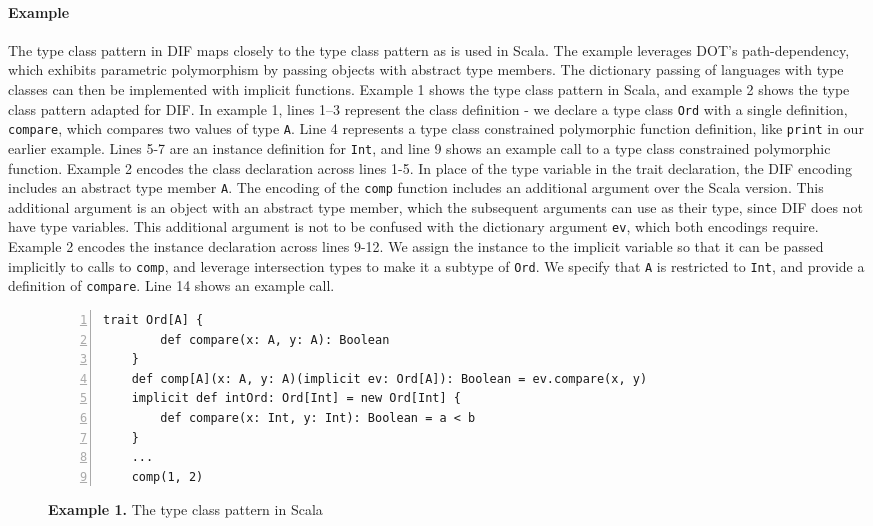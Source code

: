 \paragraph{Example} The type class pattern \cite{OBLB18} in DIF maps closely to
the type class pattern as is used in Scala. The example leverages DOT's
path-dependency, which exhibits parametric polymorphism by passing objects with
abstract type members. The dictionary passing of languages with type classes can
then be implemented with implicit functions. Example 1 shows the type class
pattern in Scala, and example 2 shows the type class pattern adapted for DIF. In
example 1, lines 1--3 represent the class definition - we declare a type class
\texttt{Ord} with a single definition, \texttt{compare}, which compares two
values of type \texttt{A}. Line 4 represents a type class constrained
polymorphic function definition, like \texttt{print} in our earlier example.
Lines 5-7 are an instance definition for \texttt{Int}, and line 9 shows an
example call to a type class constrained polymorphic function. Example 2 encodes
the class declaration across lines 1-5. In place of the type variable in the
trait declaration, the DIF encoding includes an abstract type member \texttt{A}.
The encoding of the \texttt{comp} function includes an additional argument over
the Scala version. This additional argument is an object with an abstract type
member, which the subsequent arguments can use as their type, since DIF does not
have type variables. This additional argument is not to be confused with the
dictionary argument \texttt{ev}, which both encodings require. Example 2 encodes
the instance declaration across lines 9-12. We assign the instance to the
implicit variable so that it can be passed implicitly to calls to \texttt{comp},
and leverage intersection types to make it a subtype of \texttt{Ord}. We specify
that \texttt{A} is restricted to \texttt{Int}, and provide a definition of
\texttt{compare}. Line 14 shows an example call.

\begin{figure*}[h]
\begin{lstlisting}[mathescape,numbers=left]
    trait Ord[A] {
        def compare(x: A, y: A): Boolean
    }
    def comp[A](x: A, y: A)(implicit ev: Ord[A]): Boolean = ev.compare(x, y)
    implicit def intOrd: Ord[Int] = new Ord[Int] {
        def compare(x: Int, y: Int): Boolean = a < b
    }
    ...
    comp(1, 2)
\end{lstlisting}
\caption*{\textbf{Example 1.} The type class pattern in Scala}
\end{figure*}

